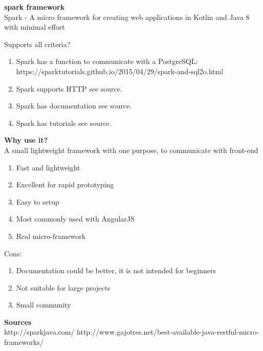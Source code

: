 \textbf{spark framework}\\
Spark - A micro framework for creating web applications in Kotlin and Java 8 with minimal effort

Supports all criteria? \\
\begin{enumerate}
	\item Spark has a function to communicate with a PostgreSQL: https://sparktutorials.github.io/2015/04/29/spark-and-sql2o.html
	\item Spark supports HTTP see source.
	\item Spark has documentation see source.
	\item Spark has tutorials see source.
\end{enumerate}


\textbf{Why use it?} \\
A small lightweight framework with one purpose, to communicate with front-end \\

\begin{enumerate}
	\item Fast and lightweight
	\item Excellent for rapid prototyping
	\item Easy to setup
	\item Most commonly used with AngularJS
	\item Real micro-framework
\end{enumerate}
Cons:
\begin{enumerate}
	\item Documentation could be better, it is not intended for beginners
	\item Not suitable for large projects
	\item Small community
\end{enumerate}

\textbf{Sources}\\
http://sparkjava.com/
http://www.gajotres.net/best-available-java-restful-micro-frameworks/